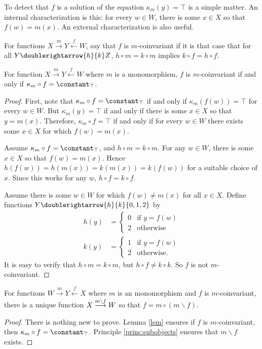 To detect that $f$ is a solution of the equation $\kappa_m(y)=\top$ is a simple matter. An internal characterization is this: for every $w\in W$, there is some $x\in X$ so that $f(w)=m(x)$. An external characterization is also useful.

\begin{defn}
	For functions $X\stackrel{m}{\longrightarrow}Y\stackrel{f}{\longleftarrow}W$, say that $f$ is {$m$-coinvariant} if it is that case that for all $Y\doublerightarrow{h}{k}Z$, $h\circ m=k\circ m$ implies $k\circ f = h\circ f$.
\end{defn}

\begin{lemma}
	For function $X\stackrel{m}{\longrightarrow}Y\stackrel{f}{\longleftarrow}W$ where $m$ is a monomorphism, $f$ is $m$-coinvariant if and only if $\kappa_m\circ f = \constant_\top$.

\begin{proof}
	First, note that $\kappa_m\circ f = \constant_\top$ if and only if
	$\kappa_m(f(w))=\top$ for every $w\in W$. But $\kappa_m(y)=\top$ if and only if there is some $x\in X$ so that $y=m(x)$. Therefore, $\kappa_m\circ f=\top$ if and only if for every $w\in W$ there exists some $x\in X$ for which $f(w)=m(x)$.
	
	Assume $\kappa_m\circ f=\constant_\top$, and $h\circ m = k\circ m$. For any $w\in W$, there is some $x\in X$ so that $f(w)=m(x)$. Hence $h(f(w)) = h(m(x)) = k(m(x)) = k(f(w))$ for a suitable choice of $x$. 
	Since this works for any $w$, $h\circ f=k\circ f$. 
	
	Assume there is some $w\in W$ for which $f(w)\neq m(x)$ for all $x\in X$. Define functions $Y\doublerightarrow{h}{k}\{0,1,2\}$ by 
	\begin{align*}h(y) &= \begin{cases}
				0 &\text{if $y=f(w)$}\\
				2 &\text{otherwise}
	\end{cases}\\
	k(y) &= \begin{cases}
	1 & \text{if $y=f(w)$}\\
	2 &\text{otherwise.}
	\end{cases}
	\end{align*}
	It is easy to verify that $h\circ m = k\circ m$, but $h\circ f \neq k\circ k$. So $f$ is not $m$-coinvariant.
\end{proof}
\end{lemma}


\begin{lemma}\label{lem:coinvariant-factoring}
	For functions $W\stackrel{m}{\longrightarrow}Y\stackrel{f}{\longleftarrow}X$ where $m$ is an monomorphism and $f$ is $m$-coinvariant, there is a unique function $\sfromto {m\backslash f}XW$ so that $f = m\circ (m\backslash f)$.
	
	\begin{proof}
		There is nothing new to prove. Lemma \ref{lem} ensures if $f$ is $m$-coinvariant, then $\kappa_m\circ f = \constant_\top$. Principle \ref{princ:subobjects} ensures that $m\backslash f$ exists.
	\end{proof}
\end{lemma}

